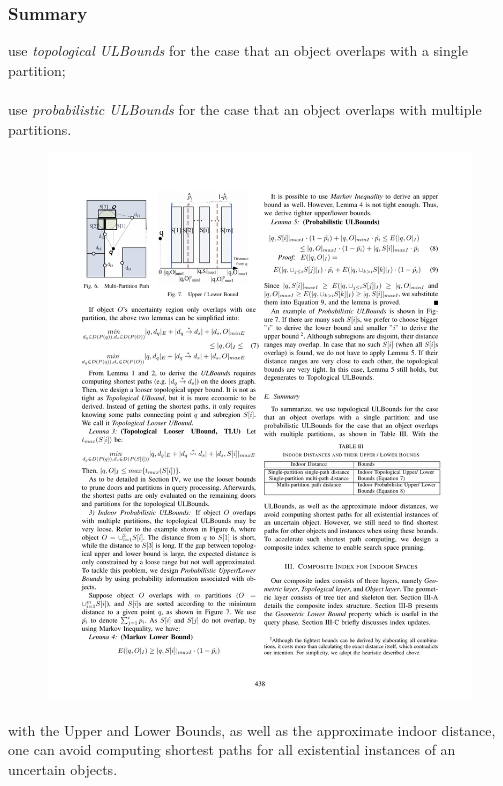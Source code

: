 \begin{frame}
\begin{columns}[c]
\end{columns}

\end{frame}


\begin{frame}
\frametitle{Summary}

use \emph{topological ULBounds} for the case that an object overlaps with a single partition; \\~\\

use \emph{probabilistic ULBounds} for the case that an object overlaps with multiple partitions.

\begin{figure}[tb]
  \includegraphics[width=0.7\columnwidth]{figures/2-6/2-6-7.pdf}
\end{figure}

with the Upper and Lower Bounds, as well as the approximate indoor distance, one can avoid computing shortest paths for all existential instances of an uncertain objects.

\end{frame}


